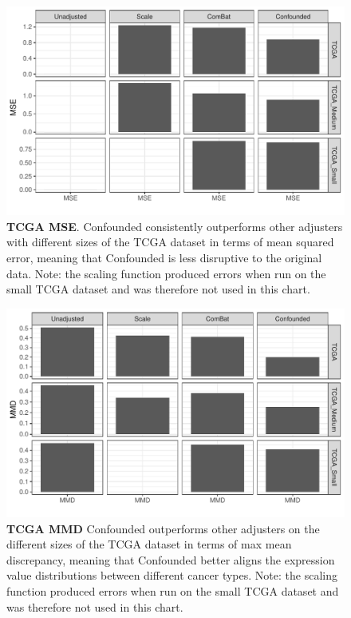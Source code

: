 \documentclass{article}
\begin{document}
\newcommand{\disclaimer}{Note: the scaling function produced errors when run on the small TCGA dataset and was therefore not used in this chart.}

\begin{figure}
	\centering
	\includegraphics[width=\columnwidth]{figures/supplement/tcga_mse.pdf}
	\caption{\textbf{TCGA MSE}.
	Confounded consistently outperforms other adjusters with different sizes of the TCGA dataset in terms of mean squared error, meaning that Confounded is less disruptive to the original data.
	\disclaimer{}
	}
	\label{fig:mse}
\end{figure}
\begin{figure}
	\centering
	\includegraphics[width=\columnwidth]{figures/supplement/tcga_mmd.pdf}
	\caption{\textbf{TCGA MMD}
	Confounded outperforms other adjusters on the different sizes of the TCGA dataset in terms of max mean discrepancy, meaning that Confounded better aligns the expression value distributions between different cancer types.
	\disclaimer{}
	}
	\label{fig:mmd}
\end{figure}
\end{document}
